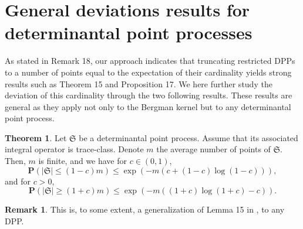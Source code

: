 \documentclass[11pt]{article}
\theoremstyle{plain}
\theoremstyle{definition}
\newtheorem{theorem}[definition]{Theorem}
\newtheorem{remark}[definition]{Remark}
\begin{document}
\section{General deviations results for determinantal point processes}

As stated in Remark 18, our approach indicates that truncating restricted DPPs to a number of points equal to the expectation of their cardinality yields strong results such as Theorem 15 and Proposition 17. We here further study the deviation of this cardinality through the two following results. These results are general as they apply not only to the Bergman kernel but to any determinantal point process.

\begin{theorem}
Let $\mathfrak S $ be a determinantal point process. Assume that its associated integral operator is trace-class. Denote $m$ the average number of points of $ \mathfrak S$. Then, $ m $ is finite, and we have for $ c \in (0,1) $,
\[
    \mathbf P( | \mathfrak S | \leqslant (1-c) m ) \leqslant \exp( -m(c +(1-c) \log(1-c) ) ),
\]
and for $ c > 0 $,
\[
    \mathbf P( | \mathfrak S | \geqslant (1+c) m ) \leqslant \exp( - m ((1+c) \log(1+c) -c)).
\]
\end{theorem}

\begin{remark}
    This is, to some extent, a generalization of Lemma 15 in \cite{DecreusefondMoroz2021}, to any DPP.
\end{remark}
\end{document}
